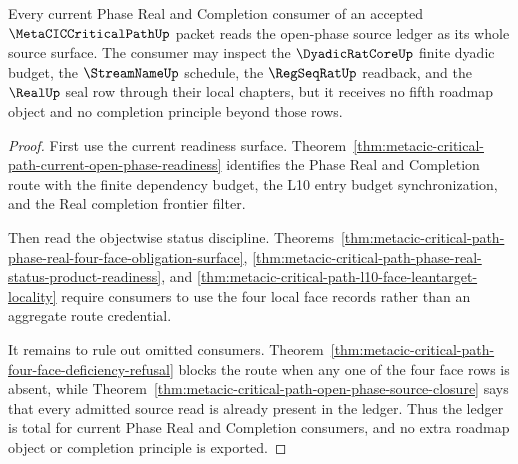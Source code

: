 \begin{theorem}
\label{thm:metacic-critical-path-open-phase-consumer-totality}
Every current Phase Real and Completion consumer of an accepted $\MetaCICCriticalPathUp$ packet reads the open-phase source ledger as its whole source surface. The consumer may inspect the $\DyadicRatCoreUp$ finite dyadic budget, the $\StreamNameUp$ schedule, the $\RegSeqRatUp$ readback, and the $\RealUp$ seal row through their local chapters, but it receives no fifth roadmap object and no completion principle beyond those rows.
\end{theorem}
\begin{proof}
First use the current readiness surface. Theorem~\ref{thm:metacic-critical-path-current-open-phase-readiness} identifies the Phase Real and Completion route with the finite dependency budget, the L10 entry budget synchronization, and the Real completion frontier filter.

Then read the objectwise status discipline. Theorems~\ref{thm:metacic-critical-path-phase-real-four-face-obligation-surface}, \ref{thm:metacic-critical-path-phase-real-status-product-readiness}, and \ref{thm:metacic-critical-path-l10-face-leantarget-locality} require consumers to use the four local face records rather than an aggregate route credential.

It remains to rule out omitted consumers. Theorem~\ref{thm:metacic-critical-path-four-face-deficiency-refusal} blocks the route when any one of the four face rows is absent, while Theorem~\ref{thm:metacic-critical-path-open-phase-source-closure} says that every admitted source read is already present in the ledger. Thus the ledger is total for current Phase Real and Completion consumers, and no extra roadmap object or completion principle is exported.
\end{proof}


